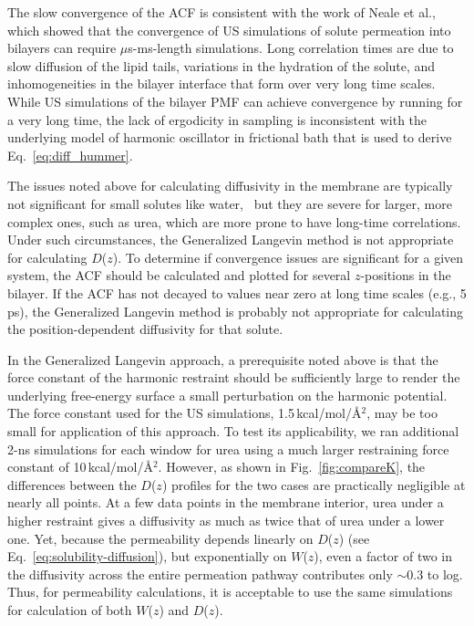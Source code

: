 The slow convergence of the ACF is consistent with the work of Neale et al.,~\cite{Neale2011}
which showed that the convergence of US simulations of solute permeation
into bilayers can require $\mu$s-ms-length simulations. Long correlation times are
due to slow diffusion of the lipid tails, variations in the hydration of the solute, and
inhomogeneities in the bilayer interface that form over very long time scales.~\cite{Neale2013}
While US simulations of the bilayer PMF can achieve convergence by running for a very long time, the
lack of ergodicity in sampling is inconsistent with the underlying model of harmonic
oscillator in frictional bath that is used to derive Eq.~\ref{eq:diff_hummer}.

The issues noted above for calculating diffusivity in the membrane are typically not
significant for small solutes like water,~\cite{Riahi2014,Issack2015}
but they are severe for larger, more complex ones, such as urea, which are more prone to
have long-time correlations. Under such circumstances, the Generalized Langevin method is not appropriate for
calculating $D$($z$).  To determine if convergence issues are significant for a given
system, the ACF should be calculated and plotted for several $z$-positions in the bilayer. If the ACF
has not decayed to values near zero at long time scales (e.g., 5 ps), the Generalized Langevin
method is probably not appropriate for calculating the position-dependent diffusivity for that solute.

In the Generalized Langevin approach, a prerequisite noted above is that the force constant
of the harmonic restraint should be sufficiently large to render the underlying free-energy
surface a small perturbation on the harmonic potential.  The force constant used for the US
simulations, 1.5\,kcal/mol/\AA$^2$, may be
too small for application of this approach.  To test its applicability, we ran additional
2-ns simulations for each window for urea using a much larger restraining force constant
of 10\,kcal/mol/\AA$^2$.  However, as shown in Fig.~\ref{fig:compareK}, the differences
between the $D$($z$) profiles for the two cases are practically negligible at nearly all
points.  At a few data points in the membrane interior, urea under a higher restraint
gives a diffusivity as much as twice that of urea under a lower one.  Yet, because
the permeability depends linearly on $D$($z$) (see Eq.~\ref{eq:solubility-diffusion}), but
exponentially on $W$($z$), even a factor of two in the diffusivity across the entire permeation
pathway contributes only $\sim$0.3 to log\perm.  Thus, for permeability calculations, it is
acceptable to use the same simulations for calculation of both $W$($z$) and $D$($z$).

